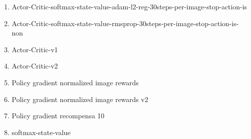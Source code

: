 \begin{enumerate}
	\item Actor-Critic-softmax-state-value-adam-l2-reg-30steps-per-image-stop-action-is
	\item Actor-Critic-softmax-state-value-rmsprop-30steps-per-image-stop-action-is-non
	\item Actor-Critic-v1
	\item Actor-Critic-v2
	\item Policy gradient normalized image rewards
	\item Policy gradient normalized image rewards v2
	\item Policy gradient recompensa 10
	\item softmax-state-value
\end{enumerate}
